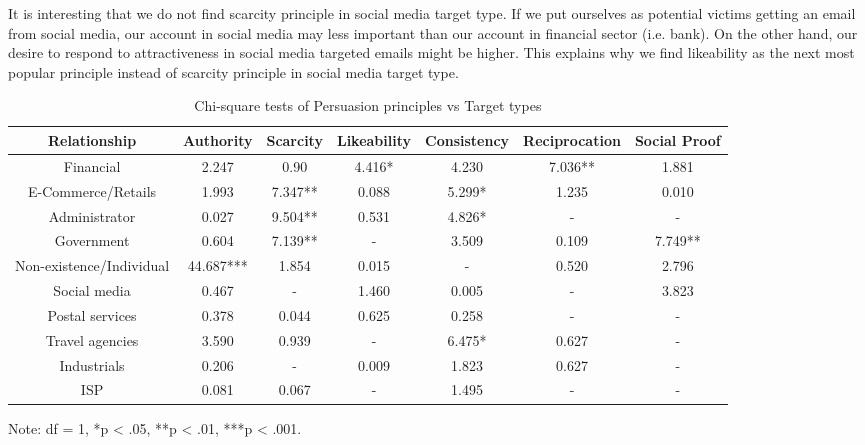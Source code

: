 It is interesting that we do not find scarcity principle in social
media target type. If we put ourselves as potential victims getting
an email from social media, our account in social media may less important
than our account in financial sector (i.e. bank). On the other hand,
our desire to respond to attractiveness in social media targeted emails
might be higher. This explains why we find likeability as the next
most popular principle instead of scarcity principle in social media
target type.

\begin{minipage}[t]{1\columnwidth}%
\begin{longtable}{ccccccc}
\caption{{\scriptsize{}\label{tab:Chi-square-persuasion-principles}Chi-square
tests of Persuasion principles vs Target types}}
\tabularnewline
\toprule 
{\scriptsize{}Relationship} & {\scriptsize{}Authority} & {\scriptsize{}Scarcity} & {\scriptsize{}Likeability} & {\scriptsize{}Consistency} & {\scriptsize{}Reciprocation} & {\scriptsize{}Social Proof}\tabularnewline
\midrule
\midrule 
{\scriptsize{}Financial} & {\scriptsize{}2.247} & {\scriptsize{}0.90} & {\scriptsize{}4.416{*}} & {\scriptsize{}4.230} & {\scriptsize{}7.036{*}{*}} & {\scriptsize{}1.881}\tabularnewline
\midrule 
{\scriptsize{}E-Commerce/Retails} & {\scriptsize{}1.993} & {\scriptsize{}7.347{*}{*}} & {\scriptsize{}0.088} & {\scriptsize{}5.299{*}} & {\scriptsize{}1.235} & {\scriptsize{}0.010}\tabularnewline
\midrule 
{\scriptsize{}Administrator} & {\scriptsize{}0.027} & {\scriptsize{}9.504{*}{*}} & {\scriptsize{}0.531} & {\scriptsize{}4.826{*}} & {\scriptsize{}-} & {\scriptsize{}-}\tabularnewline
\midrule 
{\scriptsize{}Government} & {\scriptsize{}0.604} & {\scriptsize{}7.139{*}{*}} & {\scriptsize{}-} & {\scriptsize{}3.509} & {\scriptsize{}0.109} & {\scriptsize{}7.749{*}{*}}\tabularnewline
\midrule 
{\scriptsize{}Non-existence/Individual} & {\scriptsize{}44.687{*}{*}{*}} & {\scriptsize{}1.854} & {\scriptsize{}0.015} & {\scriptsize{}-} & {\scriptsize{}0.520} & {\scriptsize{}2.796}\tabularnewline
\midrule 
{\scriptsize{}Social media} & {\scriptsize{}0.467} & {\scriptsize{}-} & {\scriptsize{}1.460} & {\scriptsize{}0.005} & {\scriptsize{}-} & {\scriptsize{}3.823}\tabularnewline
\midrule 
{\scriptsize{}Postal services} & {\scriptsize{}0.378} & {\scriptsize{}0.044} & {\scriptsize{}0.625} & {\scriptsize{}0.258} & {\scriptsize{}-} & {\scriptsize{}-}\tabularnewline
\midrule 
{\scriptsize{}Travel agencies} & {\scriptsize{}3.590} & {\scriptsize{}0.939} & {\scriptsize{}-} & {\scriptsize{}6.475{*}} & {\scriptsize{}0.627} & {\scriptsize{}-}\tabularnewline
\midrule 
{\scriptsize{}Industrials} & {\scriptsize{}0.206} & {\scriptsize{}-} & {\scriptsize{}0.009} & {\scriptsize{}1.823} & {\scriptsize{}0.627} & {\scriptsize{}-}\tabularnewline
\midrule 
{\scriptsize{}ISP} & {\scriptsize{}0.081} & {\scriptsize{}0.067} & {\scriptsize{}-} & {\scriptsize{}1.495} & {\scriptsize{}-} & {\scriptsize{}-}\tabularnewline
\midrule
\end{longtable}

Note: df = 1, {*}p < .05, {*}{*}p < .01, {*}{*}{*}p < .001.%
\end{minipage}\\
